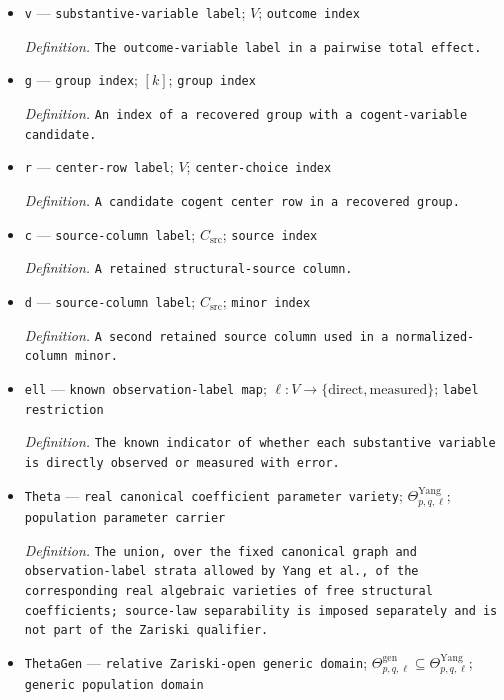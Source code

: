 \documentclass{article}
\begin{document}
\begin{itemize}
  \item \texttt{v} --- \texttt{substantive-\allowbreak{}variable label}; \(V\); \texttt{outcome index}
  \par\smallskip\noindent\emph{Definition.} \texttt{The outcome-\allowbreak{}variable label in a pairwise total effect.}
  \item \texttt{g} --- \texttt{group index}; \([k]\); \texttt{group index}
  \par\smallskip\noindent\emph{Definition.} \texttt{An index of a recovered group with a cogent-\allowbreak{}variable candidate.}
  \item \texttt{r} --- \texttt{center-\allowbreak{}row label}; \(V\); \texttt{center-\allowbreak{}choice index}
  \par\smallskip\noindent\emph{Definition.} \texttt{A candidate cogent center row in a recovered group.}
  \item \texttt{c} --- \texttt{source-\allowbreak{}column label}; \(C_{\mathrm{src}}\); \texttt{source index}
  \par\smallskip\noindent\emph{Definition.} \texttt{A retained structural-\allowbreak{}source column.}
  \item \texttt{d} --- \texttt{source-\allowbreak{}column label}; \(C_{\mathrm{src}}\); \texttt{minor index}
  \par\smallskip\noindent\emph{Definition.} \texttt{A second retained source column used in a normalized-\allowbreak{}column minor.}
  \item \texttt{ell} --- \texttt{known observation-\allowbreak{}label map}; \(\ell:V\to\{\mathrm{direct},\mathrm{measured}\}\); \texttt{label restriction}
  \par\smallskip\noindent\emph{Definition.} \texttt{The known indicator of whether each substantive variable is directly observed or measured with error.}
  \item \texttt{Theta} --- \texttt{real canonical coefficient parameter variety}; \(\Theta_{p,q,\ell}^{\mathrm{Yang}}\); \texttt{population parameter carrier}
  \par\smallskip\noindent\emph{Definition.} \texttt{The union,\allowbreak{} over the fixed canonical graph and observation-\allowbreak{}label strata allowed by Yang et al.,\allowbreak{} of the corresponding real algebraic varieties of free structural coefficients;\allowbreak{} source-\allowbreak{}law separability is imposed separately and is not part of the Zariski qualifier.}
  \item \texttt{ThetaGen} --- \texttt{relative Zariski-\allowbreak{}open generic domain}; \(\Theta_{p,q,\ell}^{\mathrm{gen}}\subseteq\Theta_{p,q,\ell}^{\mathrm{Yang}}\); \texttt{generic population domain}

\end{itemize}
\end{document}
